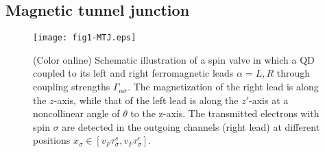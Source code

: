 \documentclass[aps,prb,twocolumn,footinbib,showpacs,superscriptaddress,preprintnumbers,amsmath,amssymb]{revtex4-1}
\begin{document}
\subsection{Magnetic tunnel junction}

\begin{figure}
  \texttt{[image: fig1-MTJ.eps]} \\
  \caption{(Color online) Schematic illustration of a spin valve in which a QD coupled to its left and right ferromagnetic leads $\alpha = L,R$ through coupling strengths $\Gamma_{\alpha\sigma}$. The magnetization of the right lead is along the $z$-axis, while that of the left lead is along the $z'$-axis at a noncollinear angle of $\theta$ to the z-axis.  The transmitted electrons with spin $\sigma$ are detected in the outgoing channels (right lead) at different positions $x_\sigma \in [v_F \tau_\sigma^s, v_F \tau_\sigma^e]$. }
  \label{fig1}
\end{figure}
\end{document}

